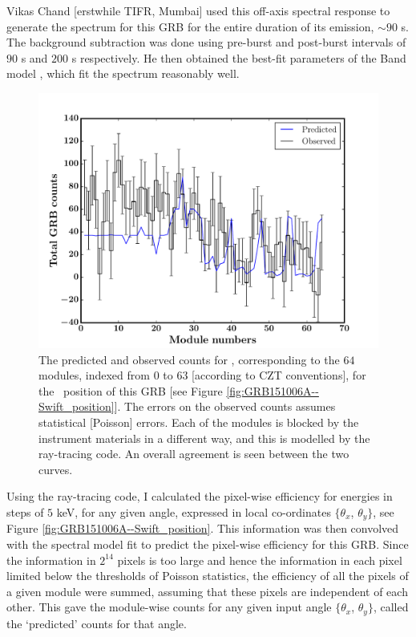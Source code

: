 Vikas Chand [erstwhile TIFR, Mumbai] used this off-axis spectral response to generate the spectrum for this GRB for the entire duration of its emission, $\sim 90$ s. The background subtraction was done using pre-burst and post-burst intervals of $90$ s and $200$ s respectively. He then obtained the best-fit parameters of the Band model \citep{Band_et_al.-1993-ApJ}, which fit the spectrum reasonably well.

\begin{figure}
\begin{center}
\includegraphics[scale=0.46]{GRB151006A--comparison}
\caption[Comparison between predicted and observed counts of \grb\ versus CZTI modules]{The predicted and observed counts for \grb, corresponding to the $64$ modules, indexed from $0$ to $63$ [according to CZT conventions], for the \s\ position of this GRB [see Figure \ref{fig:GRB151006A--Swift_position}]. The errors on the observed counts assumes statistical [Poisson] errors. Each of the modules is blocked by the instrument materials in a different way, and this is modelled by the ray-tracing code. An overall agreement is seen between the two curves.}
\label{fig:GRB151006A--comparison}
\end{center}
\end{figure}

Using the ray-tracing code, I calculated the pixel-wise efficiency for energies in steps of $5$ keV, for any given angle, expressed in local co-ordinates $\{ \theta_x$, $\theta_y \}$, see Figure \ref{fig:GRB151006A--Swift_position}. This information was then convolved with the spectral model fit to predict the pixel-wise efficiency for this GRB. Since the information in $2^{14}$ pixels is too large and hence the information in each pixel limited below the thresholds of Poisson statistics, the efficiency of all the pixels of a given module were summed, assuming that these pixels are independent of each other. This gave the module-wise counts for any given input angle $\{ \theta_x$, $\theta_y \}$, called the `predicted' counts for that angle.

